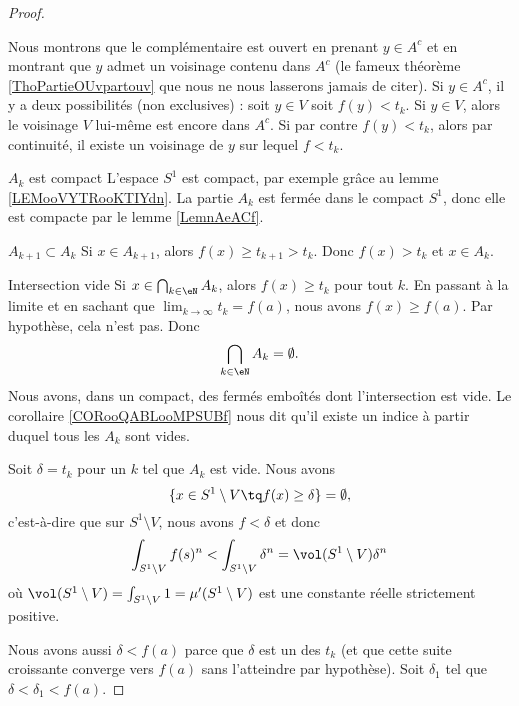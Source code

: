 \begin{proof}
\begin{subproof}
        Nous montrons que le complémentaire est ouvert en prenant \( y\in A^c\) et en montrant que \( y\) admet un voisinage contenu dans \( A^c\) (le fameux théorème \ref{ThoPartieOUvpartouv} que nous ne nous lasserons jamais de citer). Si \( y\in A^c\), il y a deux possibilités (non exclusives) : soit \( y\in V\) soit \( f(y)<t_k\). Si \( y\in V\), alors le voisinage \( V\) lui-même est encore dans \( A^c\). Si par contre \( f(y)<t_k\), alors par continuité, il existe un voisinage de \( y\) sur lequel \( f<t_k\).
    \item[\( A_k\) est compact]
        L'espace \( S^1\) est compact, par exemple grâce au lemme \ref{LEMooVYTRooKTIYdn}. La partie \( A_k\) est fermée dans le compact \( S^1\), donc elle est compacte par le lemme \ref{LemnAeACf}.
    \item[\( A_{k+1}\subset A_k\)]
        Si \( x\in A_{k+1}\), alors \( f(x)\geq t_{k+1}>t_k\). Donc \( f(x)>t_k\) et \( x\in A_k\).
    \item[Intersection vide]
        Si \( x\in\bigcap_{k\in \eN}A_k\), alors \( f(x)\geq t_k\) pour tout \( k\). En passant à la limite et en sachant que \( \lim_{k\to \infty} t_k=f(a)\), nous avons \( f(x)\geq f(a)\). Par hypothèse, cela n'est pas. Donc
        \begin{equation}
            \bigcap_{k\in \eN}A_k=\emptyset.
        \end{equation}
        Nous avons, dans un compact, des fermés emboîtés dont l'intersection est vide. Le corollaire \ref{CORooQABLooMPSUBf} nous dit qu'il existe un indice à partir duquel tous les \( A_k\) sont vides.
    \end{subproof}
    
    Soit \( \delta=t_k\) pour un \( k\) tel que \( A_k\) est vide. Nous avons
    \begin{equation}
        \{ x\in S^1\setminus V\tq f(x)\geq \delta \}=\emptyset,
    \end{equation}
    c'est-à-dire que sur \( S^1\setminus V\), nous avons \( f<\delta\) et donc
    \begin{equation}
        \int_{S^1\setminus V}f(s)^n<\int_{S^1\setminus V}\delta^n=\vol(S^1\setminus V)\delta^n
    \end{equation}
    où \( \vol(S^1\setminus V)=\int_{S^1\setminus V}1=\mu'(S^1\setminus V)\) est une constante réelle strictement positive.

    Nous avons aussi \( \delta<f(a)\) parce que \( \delta\) est un des \( t_k\) (et que cette suite croissante converge vers \( f(a)\) sans l'atteindre par hypothèse). Soit \( \delta_1\) tel que \( \delta<\delta_1<f(a)\).


\end{proof}
